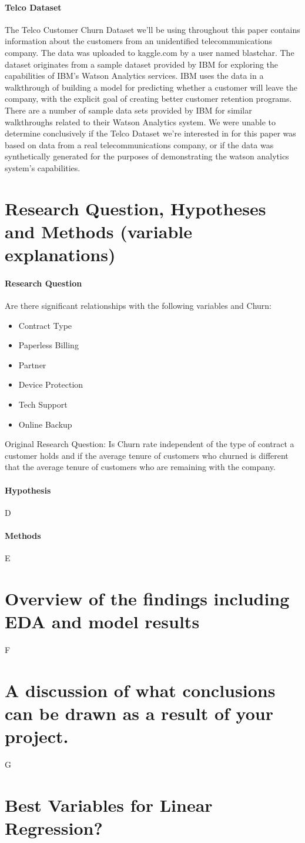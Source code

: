 \documentclass[man]{apa6}
\begin{document}
\paragraph{Telco Dataset}
The Telco Customer Churn Dataset we'll be using throughout this paper contains information about the customers from an unidentified telecommunications company. The data was uploaded to kaggle.com by a user named blastchar. \cite{blastchar_2018} The dataset originates from a sample dataset provided by IBM for exploring the capabilities of IBM's Watson Analytics services. IBM uses the data in a walkthrough of building a model for predicting whether a customer will leave the company, with the explicit goal of creating better customer retention programs. \cite{ibm_telco_2015} There are a number of sample data sets provided by IBM for similar walkthroughs related to their Watson Analytics system. \cite{ibm_data_2015} We were unable to determine conclusively if the Telco Dataset we're interested in for this paper was based on data from a real telecommunications company, or if the data was synthetically generated for the purposes of demonstrating the watson analytics system's capabilities.

\section{Research Question, Hypotheses and Methods (variable explanations)}
\paragraph{Research Question}
Are there significant relationships with the following variables and Churn:
\begin{itemize}
\item{Contract Type}
\item{Paperless Billing}
\item{Partner}
\item{Device Protection}
\item{Tech Support}
\item{Online Backup}
\end{itemize}
Original Research Question:
Is Churn rate independent of the type of contract a customer holds and if the average tenure of customers who churned is different that the average tenure of customers who are remaining with the company.

\paragraph{Hypothesis}
D
\paragraph{Methods}
E
\section{Overview of the findings including EDA and model results}
F
\section{A discussion of what conclusions can be drawn as a result of your project.}
G
\appendix
\section{Best Variables for Linear Regression?}
\newpage
\printbibliography
\end{document}
